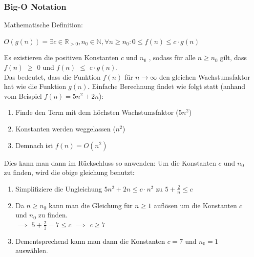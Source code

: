 \documentclass[
../../AuD-Zusammenfassung.tex,
]
{subfiles}
\begin{document}
\subsubsection{Big-O Notation}
Mathematische Definition: 
\begin{center}
    $O(g(n)) = \exists c \in \mathbb{R}_{>0}, n_0 \in \mathbb{N}, \forall n \geq n_0:  0 \leq f(n) \leq c \cdot g(n)$
\end{center}
Es existieren die positiven Konstanten $c$ und $n_0$ , sodass für alle $n \geq n_0$ gilt, dass  $f(n)$ $\geq$ 0 und $f(n)$ $\leq$ $c \cdot g(n)$. \\
Das bedeutet, dass die Funktion $f(n)$ für $n \to \infty$ den gleichen Wachstumsfaktor hat wie die Funktion $g(n)$.
Einfache Berechnung findet wie folgt statt (anhand vom Beispiel $f(n) = 5n^2 + 2n$):
\begin{enumerate}
    \item Finde den Term mit dem höchsten Wachstumsfaktor ($5n^2$)
    \item Konstanten werden weggelassen ($n^2$)
    \item Demnach ist $f(n) = O(n^2)$
\end{enumerate}
Dies kann man dann im Rückschluss so anwenden:
Um die Konstanten $c$ und $n_0$ zu finden, wird die obige gleichung benutzt:
\begin{enumerate}
    \item Simplifiziere die Ungleichung $5n^2 + 2n \leq c \cdot n^2$ zu $5 + \frac{2}{n} \leq c$
    \item Da $n \geq n_0$ kann man die Gleichung für $n \geq 1$ auflösen um die Konstanten $c$ und $n_0$ zu finden. \\
    $\implies$ $5 + \frac{2}{1} = 7 \leq c$ $\implies$ $c \geq 7$
    \item Dementsprechend kann man dann die Konstanten $c = 7$ und $n_0 = 1$ auswählen.
\end{enumerate}

\newpage
\end{document}
